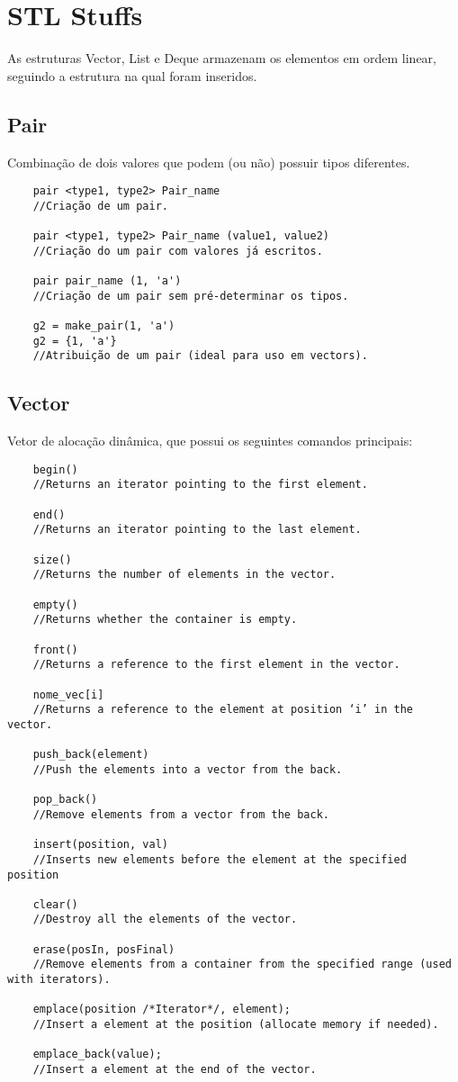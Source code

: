 \section{STL Stuffs}
As estruturas Vector, List e Deque armazenam os elementos em ordem linear,
seguindo a estrutura na qual foram inseridos.

\subsection{Pair}
Combinação de dois valores que podem (ou não) possuir tipos diferentes.
\begin{verbatim}
    pair <type1, type2> Pair_name 
    //Criação de um pair.

    pair <type1, type2> Pair_name (value1, value2) 
    //Criação do um pair com valores já escritos.

    pair pair_name (1, 'a') 
    //Criação de um pair sem pré-determinar os tipos.

    g2 = make_pair(1, 'a')
    g2 = {1, 'a'}
    //Atribuição de um pair (ideal para uso em vectors).
\end{verbatim}

\subsection{Vector}
Vetor de alocação dinâmica, que possui os seguintes comandos principais:
\begin{verbatim}
    begin()
    //Returns an iterator pointing to the first element.

    end() 
    //Returns an iterator pointing to the last element.

    size() 
    //Returns the number of elements in the vector.

    empty() 
    //Returns whether the container is empty.

    front() 
    //Returns a reference to the first element in the vector.

    nome_vec[i] 
    //Returns a reference to the element at position ‘i’ in the vector.

    push_back(element) 
    //Push the elements into a vector from the back.

    pop_back() 
    //Remove elements from a vector from the back.

    insert(position, val) 
    //Inserts new elements before the element at the specified position

    clear() 
    //Destroy all the elements of the vector.

    erase(posIn, posFinal) 
    //Remove elements from a container from the specified range (used with iterators).

    emplace(position /*Iterator*/, element); 
    //Insert a element at the position (allocate memory if needed).

    emplace_back(value); 
    //Insert a element at the end of the vector.
\end{verbatim}

